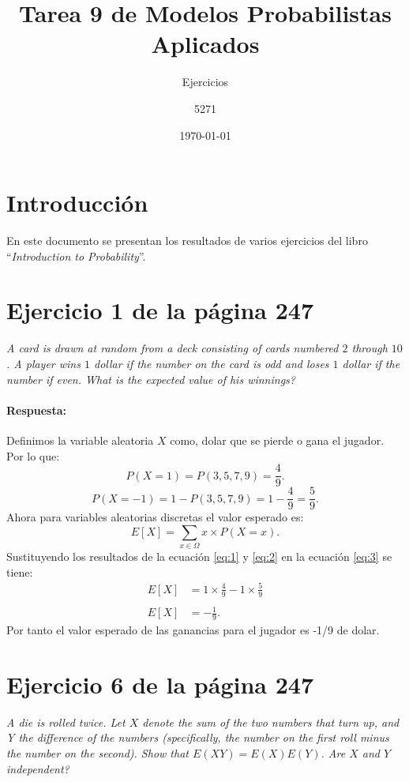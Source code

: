 \documentclass{article}
\title{Tarea 9 de Modelos Probabilistas Aplicados}
\subtitle{Ejercicios}
\author{5271}
\date{\today}
\begin{document}
\maketitle
\section{Introducción}
En este documento se presentan los resultados de varios ejercicios del libro ``\textit{Introduction to Probability}''\cite{libProba}.
\section{Ejercicio 1 de la página 247}
\emph{A card is drawn at random from a deck consisting of cards numbered $2$ through $10$. A player wins $1$ dollar if the number on the card is odd and loses $1$ dollar if the number if even. What is the expected value of his winnings?}

\paragraph{Respuesta:}

Definimos la variable aleatoria $X$ como, dolar que se pierde o gana el jugador. Por lo que:
\begin{equation}\label{eq:1}
P(X = 1) = P ({3,5,7,9}) = \frac{4}{9} . 
\end{equation}
\begin{equation}\label{eq:2}
P(X = -1) = 1- P ({3,5,7,9}) = 1- \frac{4}{9} = \frac{5}{9}.
\end{equation}
Ahora para variables aleatorias discretas el valor esperado es:
\begin{equation}\label{eq:3}
 E[X] = \sum_{x \in \Omega} x
	      \times P(X = x).   
\end{equation}
Sustituyendo los resultados de la ecuación \ref{eq:1}  y \ref{eq:2} en la ecuación \ref{eq:3} se tiene: 
\begin{equation}\label{eq:4}
\begin{array}{ll}
 E[X] &= 1 \times \frac{4}{9} - 1 \times \frac{5}{9} \\
       & \\
 E[X]  &= - \frac{1}{9}.
 \end{array}
\end{equation}
 Por tanto el valor esperado de las ganancias para el jugador es -1/9 de dolar.


\section{Ejercicio 6 de la página 247}
\emph{A die is rolled twice. Let $X$ denote the sum of the two numbers that turn up, and Y the difference of the numbers (specifically, the number on the first roll minus the number on the second). Show that $E(X Y) = E(X)E(Y )$. Are $X$ and $Y$ independent?}
\end{document}
